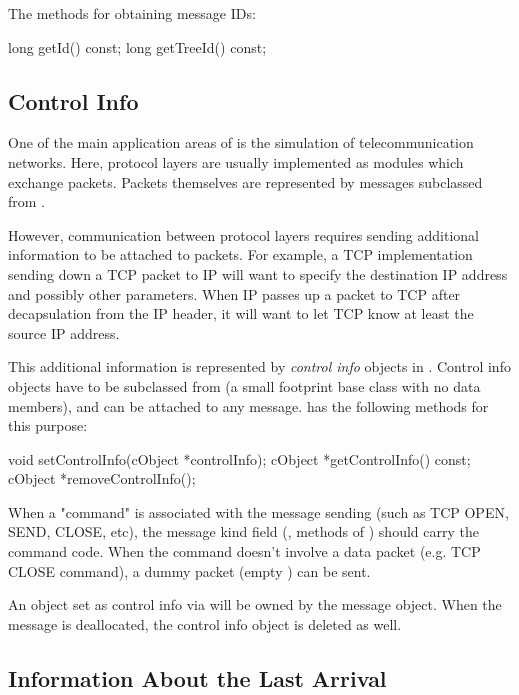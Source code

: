 The methods for obtaining message IDs:

\begin{cpp}
long getId() const;
long getTreeId() const;
\end{cpp}


\subsection{Control Info}
\label{sec:messages:control-info}

One of the main application areas of {\opp} is the simulation of
telecommunication networks. Here, protocol layers are usually
implemented as modules which exchange packets. Packets themselves
are represented by messages subclassed from .

However, communication between protocol layers requires sending
additional information to be attached to packets. For example,
a TCP implementation sending down a TCP packet to IP will want
to specify the destination IP address and possibly
other parameters. When IP passes up a packet to TCP after
decapsulation from the IP header, it will want to let TCP know
at least the source IP address.

This additional information is represented by \textit{control info} objects
in {\opp}. Control info objects have to be subclassed from 
(a small footprint base class with no data members), and can be attached to
any message.  has the following methods for this purpose:

\begin{cpp}
void setControlInfo(cObject *controlInfo);
cObject *getControlInfo() const;
cObject *removeControlInfo();
\end{cpp}

When a "command" is associated with the message sending (such as
TCP OPEN, SEND, CLOSE, etc), the message kind field (,
 methods of ) should carry the command code.
When the command doesn't involve a data packet (e.g.
TCP CLOSE command), a dummy packet (empty ) can be sent.

An object set as control info via  will be owned
by the message object. When the message is deallocated, the control
info object is deleted as well.


\subsection{Information About the Last Arrival}
\label{sec:messages:information-about-last-arrival}

